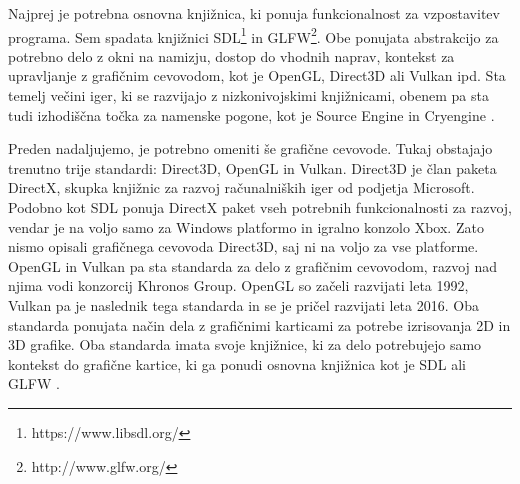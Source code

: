 \documentclass[12pt,a4paper,twoside]{book}
\begin{document}
Najprej je potrebna osnovna knjižnica, ki ponuja funkcionalnost za vzpostavitev programa. Sem spadata knjižnici SDL\footnote{https://www.libsdl.org/}\cite{sdllib} in GLFW\footnote{http://www.glfw.org/}\cite{glfw}. Obe ponujata abstrakcijo za potrebno delo z okni na namizju, dostop do vhodnih naprav, kontekst za upravljanje z grafičnim cevovodom, kot je OpenGL, Direct3D ali Vulkan ipd. Sta temelj večini iger, ki se razvijajo z nizkonivojskimi knjižnicami, obenem pa sta tudi izhodiščna točka za namenske pogone, kot je Source Engine \cite{sourceEngineSDL} in Cryengine \cite{cryengineSDL}.

Preden nadaljujemo, je potrebno omeniti še grafične cevovode. Tukaj obstajajo trenutno trije standardi: Direct3D, OpenGL in Vulkan. Direct3D je član paketa DirectX, skupka knjižnic za razvoj računalniških iger od podjetja Microsoft. Podobno kot SDL ponuja DirectX paket vseh potrebnih funkcionalnosti za razvoj, vendar je na voljo samo za Windows platformo in igralno konzolo Xbox. Zato nismo opisali grafičnega cevovoda Direct3D, saj ni na voljo za vse platforme. OpenGL in Vulkan pa sta standarda za delo z grafičnim cevovodom, razvoj nad njima vodi konzorcij Khronos Group. OpenGL so začeli razvijati leta 1992, Vulkan pa je naslednik tega standarda in se je pričel razvijati leta 2016. Oba standarda ponujata način dela z grafičnimi karticami za potrebe izrisovanja 2D in 3D grafike. Oba standarda imata svoje knjižnice, ki za delo potrebujejo samo kontekst do grafične kartice, ki ga ponudi osnovna knjižnica kot je SDL ali GLFW \cite{opengl}. 
\end{document}
